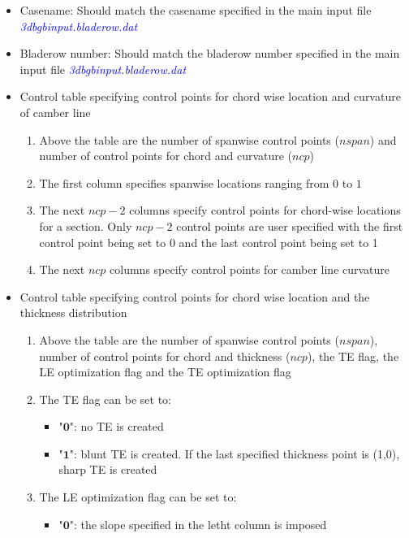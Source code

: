 \documentclass[8pt]{article}
\begin{document}
\noindent
\begin{itemize}[leftmargin=*]
    \item Casename: Should match the casename specified in the main input file \textit{\textcolor{blue}{3dbgbinput.bladerow.dat}}
    \item Bladerow number: Should match the bladerow number specified in the main input file \textit{\textcolor{blue}{3dbgbinput.bladerow.dat}}
    \item Control table specifying control points for chord wise location and curvature of camber line
    \begin{enumerate}[label=\alph*]
        \item Above the table are the number of spanwise control points ($nspan$) and number of control points for chord and curvature ($ncp$)
        \item The first column specifies spanwise locations ranging from $0$ to $1$
        \item The next $ncp - 2$ columns specify control points for chord-wise locations for a section. Only $ncp - 2$ control points are user specified with the first control point being set to 0 and the last control point being set to 1
        \item The next $ncp$ columns specify control points for camber line curvature
    \end{enumerate}
    \item Control table specifying control points for chord wise location and the thickness distribution
    \begin{enumerate}[label=\alph*]
        \item Above the table are the number of spanwise control points ($nspan$), number of control points for chord and thickness ($ncp$), the TE flag, the LE optimization flag and the TE optimization flag
        \item The TE flag can be set to:
        \begin{itemize}[label=\FilledSmallSquare]
            \item "$\mathbf{0}$": no TE is created
            \item "$\mathbf{1}$": blunt TE is created. If the last specified thickness point is (1,0), sharp TE is created
        \end{itemize}
        \item The LE optimization flag can be set to:
        \begin{itemize}[label=\FilledSmallSquare]
            \item "$\mathbf{0}$": the slope specified in the letht column is imposed

\end{itemize}
\end{enumerate}
\end{itemize}
\end{document}
